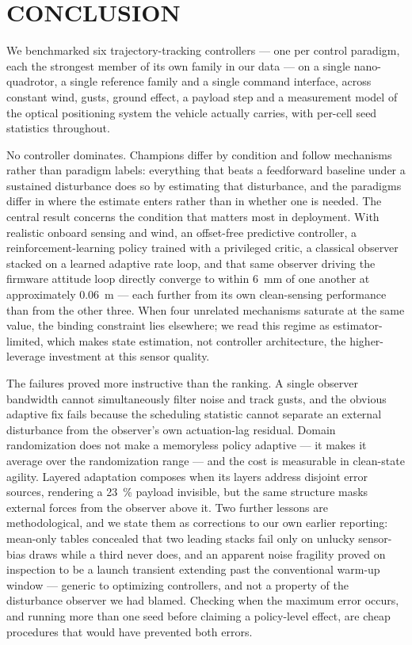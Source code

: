 \section{CONCLUSION}
\label{sec:conclusion}

We benchmarked six trajectory-tracking controllers --- one per control paradigm, each
the strongest member of its own family in our data --- on a single nano-quadrotor, a
single reference family and a single command interface, across constant wind, gusts,
ground effect, a payload step and a measurement model of the optical positioning system
the vehicle actually carries, with per-cell seed statistics throughout.

No controller dominates. Champions differ by condition and follow mechanisms rather than
paradigm labels: everything that beats a feedforward baseline under a sustained
disturbance does so by estimating that disturbance, and the paradigms differ in where
the estimate enters rather than in whether one is needed. The central result concerns
the condition that matters most in deployment. With realistic onboard sensing and wind,
an offset-free predictive controller, a reinforcement-learning policy trained with a
privileged critic, a classical observer stacked on a learned adaptive rate loop, and that
same observer driving the firmware attitude loop directly converge to within
\SI{6}{\milli\meter} of one another at approximately \SI{0.06}{\meter} --- each further
from its own clean-sensing performance than from the other three. When four unrelated
mechanisms saturate at the same value, the binding constraint lies elsewhere; we read
this regime as estimator-limited, which makes state estimation, not controller
architecture, the higher-leverage investment at this sensor quality.

The failures proved more instructive than the ranking. A single observer bandwidth
cannot simultaneously filter noise and track gusts, and the obvious adaptive fix fails
because the scheduling statistic cannot separate an external disturbance from the
observer's own actuation-lag residual. Domain randomization does not make a memoryless
policy adaptive --- it makes it average over the randomization range --- and the cost is
measurable in clean-state agility. Layered adaptation composes when its layers address
disjoint error sources, rendering a \SI{23}{\percent} payload invisible, but the same
structure masks external forces from the observer above it. Two further lessons are
methodological, and we state them as corrections to our own earlier reporting: mean-only
tables concealed that two leading stacks fail only on unlucky sensor-bias draws while a
third never does, and an apparent noise fragility proved on inspection to be a launch
transient extending past the conventional warm-up window --- generic to optimizing
controllers, and not a property of the disturbance observer we had blamed. Checking when
the maximum error occurs, and running more than one seed before claiming a policy-level
effect, are cheap procedures that would have prevented both errors.

